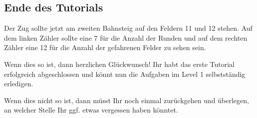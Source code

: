 \subsection*{Ende des Tutorials}
  Der Zug sollte jetzt am zweiten Bahnsteig auf den Feldern 11 und 12 stehen. Auf dem linken Zähler sollte eine 7 für die Anzahl der Runden und auf dem rechten Zähler eine 12 für die Anzahl der gefahrenen Felder zu sehen sein.
  \begin{framed}\noindent
    Wenn dies so ist, dann herzlichen Glückwunsch! Ihr habt das erste Tutorial erfolgreich abgeschlossen und könnt nun die Aufgaben im Level 1 selbstständig erledigen.
  \end{framed}
  \begin{framed}\noindent
    Wenn dies nicht so ist, dann müsst Ihr noch einmal zurückgehen und überlegen, an welcher Stelle Ihr ggf. etwas vergessen haben könntet.
  \end{framed}
